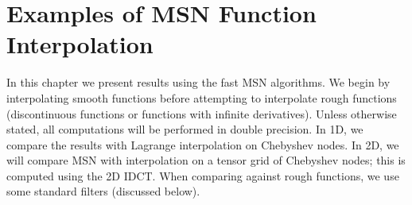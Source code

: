 \chapter{Examples of MSN Function Interpolation}
\label{chap:func_interp}

In this chapter we present results using the fast MSN algorithms.
We begin by interpolating smooth functions before
attempting to interpolate rough functions (discontinuous functions
or functions with infinite derivatives).
Unless otherwise stated, all computations will be performed
in double precision.
In 1D, we compare the results with Lagrange interpolation on
Chebyshev nodes.
In 2D, we will compare MSN with interpolation on a tensor grid of
Chebyshev nodes; this is computed using the 2D IDCT.
When comparing against rough functions, we use some standard
filters (discussed below).

